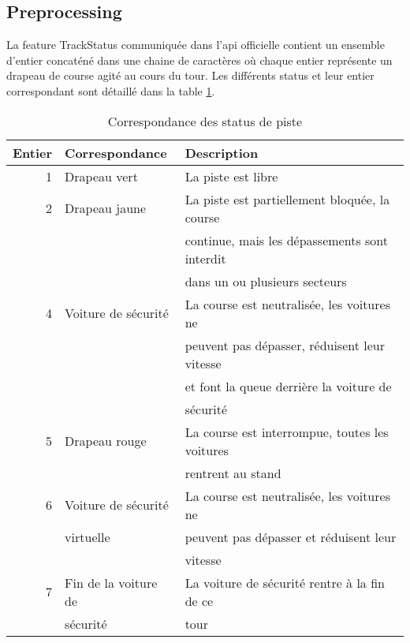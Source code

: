 \subsection{Preprocessing}
La feature TrackStatus communiquée dans l'api officielle contient un ensemble d'entier concaténé dans une chaine de caractères où chaque entier représente un drapeau de course agité au cours du tour.
Les différents status et leur entier correspondant sont détaillé dans la table \ref{track_status_table}.
\begin{table}[H]
    \begin{center}
        \caption{\label{track_status_table}Correspondance des status de piste}
        \begin{tabular}{r|l|l}
            Entier & Correspondance       & Description                                    \\ \hline
            1      & Drapeau vert         & La piste est libre                             \\
            2      & Drapeau jaune        & La piste est partiellement bloquée, la course  \\
                   &                      & continue, mais les dépassements sont interdit  \\
                   &                      & dans un ou plusieurs secteurs                  \\
            4      & Voiture de sécurité  & La course est neutralisée, les voitures ne     \\
                   &                      & peuvent pas dépasser, réduisent leur vitesse   \\
                   &                      & et font la queue derrière la voiture de        \\
                   &                      & sécurité                                       \\
            5      & Drapeau rouge        & La course est interrompue, toutes les voitures \\
                   &                      & rentrent au stand                              \\
            6      & Voiture de sécurité  & La course est neutralisée, les voitures ne     \\
                   & virtuelle            & peuvent pas dépasser et réduisent leur         \\
                   &                      & vitesse                                        \\
            7      & Fin de la voiture de & La voiture de sécurité rentre à la fin de ce   \\
                   & sécurité             & tour
        \end{tabular}
    \end{center}
\end{table}

